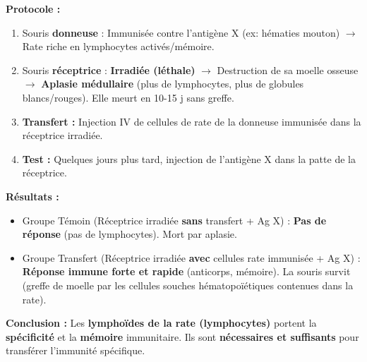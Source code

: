 \documentclass[11pt]{article}
\begin{document}
\begin{experience}
\textbf{Protocole :}
\begin{enumerate}
    \item Souris \textbf{donneuse} : Immunisée contre l'antigène X (ex: hématies mouton) $\rightarrow$ Rate riche en lymphocytes activés/mémoire.
    \item Souris \textbf{réceptrice} : \textbf{Irradiée (léthale)} $\rightarrow$ Destruction de sa moelle osseuse $\rightarrow$ \textbf{Aplasie médullaire} (plus de lymphocytes, plus de globules blancs/rouges). Elle meurt en 10-15 j sans greffe.
    \item \textbf{Transfert :} Injection IV de cellules de rate de la donneuse immunisée dans la réceptrice irradiée.
    \item \textbf{Test :} Quelques jours plus tard, injection de l'antigène X dans la patte de la réceptrice.
\end{enumerate}
\textbf{Résultats :}
\begin{itemize}
    \item Groupe Témoin (Réceptrice irradiée \textbf{sans} transfert + Ag X) : \textbf{Pas de réponse} (pas de lymphocytes). Mort par aplasie.
    \item Groupe Transfert (Réceptrice irradiée \textbf{avec} cellules rate immunisée + Ag X) : \textbf{Réponse immune forte et rapide} (anticorps, mémoire). La souris survit (greffe de moelle par les cellules souches hématopoïétiques contenues dans la rate).
\end{itemize}
\textbf{Conclusion :} Les \textbf{lymphoïdes de la rate (lymphocytes)} portent la \textbf{spécificité} et la \textbf{mémoire} immunitaire. Ils sont \textbf{nécessaires et suffisants} pour transférer l'immunité spécifique.
\end{experience}
\end{document}

